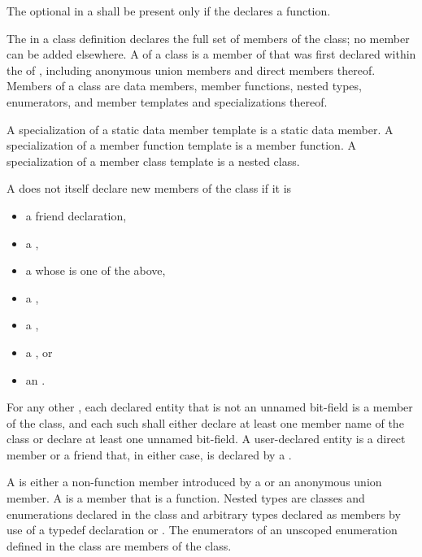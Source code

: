 \pnum
The optional 
in a 
shall be present only if
the  declares a function.

\pnum
{}%
The  in a class definition declares the
full set of members of the class; no member can be added elsewhere.
A  of a class  is a member of 
that was first declared within the  of ,
including anonymous union members and direct members thereof.
Members of a class are data members, member
functions, nested types, enumerators,
and member templates and specializations thereof.
\begin{note}
A specialization of a static data member template is a static data member.
A specialization of a member function template is a member function.
A specialization of a member class template is a nested class.
\end{note}

\pnum
A  does not itself declare new members of the class
if it is
\begin{itemize}
\item a friend declaration,
\item a ,
\item a  whose  is one of the above,
\item a ,
\item a ,
\item a , or
\item an .
\end{itemize}
For any other ,
each declared entity
that is not an unnamed bit-field
is a member of the class,
and each such 
shall either
declare at least one member name of the class
or declare at least one unnamed bit-field.
A user-declared entity is
a direct member or a friend that, in either case,
is declared by a .

\pnum
A  is either a non-function member introduced by a
 or an anonymous union member.
A  is a member that is a function.
Nested types are classes and
enumerations declared in the class and arbitrary types
declared as members by use of a typedef declaration
or .
The enumerators of an unscoped enumeration defined in the class
are members of the class.

